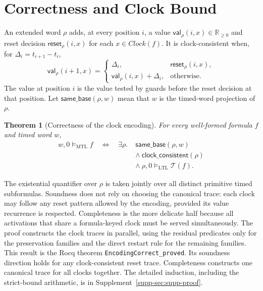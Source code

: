 \documentclass[10pt,journal,compsoc]{IEEEtran}
\newtheorem{theorem}{Theorem}[section]
\newcommand{\Real}{\mathbb{R}}
\newcommand{\satM}{\models_{\mathrm{MTL}}}
\newcommand{\satL}{\models_{\mathrm{LTL}}}
\newcommand{\T}{\mathcal{T}}
\newcommand{\CVal}{\mathsf{val}}
\newcommand{\CReset}{\mathsf{reset}}
\newcommand{\Clock}{\mathit{Clock}}
\begin{document}


\section{Correctness and Clock Bound}
\label{sec:correctness}
\label{sec:encoding-correctness}
An extended word $\rho$ adds, at every position $i$, a value
$\CVal_\rho(i,x)\in\Real_{\ge0}$ and reset decision
$\CReset_\rho(i,x)$ for each $x\in\Clock(f)$. It is clock-consistent when,
for $\Delta_i=t_{i+1}-t_i$,
\begin{equation}
\CVal_\rho(i+1,x)=
\begin{cases}
\Delta_i,&\CReset_\rho(i,x),\\
\CVal_\rho(i,x)+\Delta_i,&\text{otherwise.}
\end{cases}
\label{eq:clock-update}
\end{equation}
The value at position $i$ is the value tested by guards before the reset
decision at that position. Let $\mathsf{same\_base}(\rho,w)$ mean that $w$
is the timed-word projection of $\rho$.

\begin{theorem}[Correctness of the clock encoding]
\label{thm:encoding-correctness}
For every well-formed formula $f$ and timed word $w$,
\begin{align*}
w,0\satM f\quad\Longleftrightarrow\quad
\exists\rho.\;&\mathsf{same\_base}(\rho,w)\\[-1mm]
&\land\ \mathsf{clock\_consistent}(\rho)\\[-1mm]
&\land\ \rho,0\satL\T(f).
\end{align*}
\end{theorem}
The existential quantifier over $\rho$ is taken jointly over all distinct
primitive timed subformulas. Soundness does not rely on choosing the canonical trace:
each clock may follow any reset pattern allowed by the encoding, provided its
value recurrence is respected. Completeness is the more delicate half
because all activations that share a formula-keyed clock must be served
simultaneously. The proof constructs the clock traces in parallel, using the
residual predicates only for the preservation families and the direct
restart rule for the remaining families.
This result is the Rocq theorem \texttt{EncodingCorrect\_proved}. Its
soundness direction holds for any clock-consistent reset trace. Completeness
constructs one canonical trace for all clocks together. The detailed
induction, including the strict-bound arithmetic, is in
Supplement~\ref{supp-sec:supp-proof}.
\end{document}

